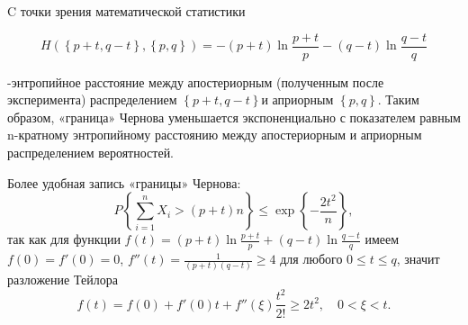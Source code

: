 \begin{problem}
\begin{ordre}
\end{ordre}

\begin{remark}
C точки зрения математической статистики 

\[
H\left(\left\{p+t,q-t\right\},\left\{p,q\right\}\right)=-(p+t)\ln \frac{p+t}{p} -(q-t)\ln \frac{q-t}{q} 
\]

-энтропийное расстояние между апостериорным (полученным после эксперимента) распределением $\left\{p+t,q-t\right\}$и априорным $\left\{p,q\right\}$. Таким образом, «граница» Чернова уменьшается экспоненциально с показателем равным n-кратному энтропийному расстоянию между апостериорным и априорным распределением вероятностей.\textbf{}

\noindent Более удобная запись «границы» Чернова:
\[P\left\{\sum _{i=1}^{n}X_{i} >(p+t)n \right\}\le \exp \left\{-\frac{2t^{2} }{n} \right\},\] 
так как для функции $f(t)=(p+t)\ln \frac{p+t}{p} +(q-t)\ln \frac{q-t}{q} $ имеем $f(0)=f'(0)=0$, $f''(t)=\frac{1}{(p+t)(q-t)} \ge 4$ для любого $0\le t\le q$, значит разложение Тейлора 
\[f(t)=f(0)+f'(0)t+f''(\xi )\frac{t^{2} }{2!} \ge 2t^{2} ,\quad 0<\xi <t.\]

\end{remark}

\end{problem}